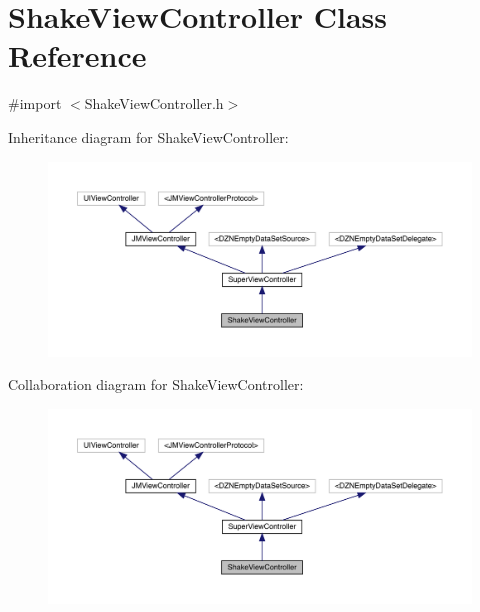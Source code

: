 \hypertarget{interface_shake_view_controller}{}\section{Shake\+View\+Controller Class Reference}
\label{interface_shake_view_controller}


{\ttfamily \#import $<$Shake\+View\+Controller.\+h$>$}



Inheritance diagram for Shake\+View\+Controller\+:\nopagebreak
\begin{figure}[H]
\begin{center}
\leavevmode
\includegraphics[width=350pt]{interface_shake_view_controller__inherit__graph}
\end{center}
\end{figure}


Collaboration diagram for Shake\+View\+Controller\+:\nopagebreak
\begin{figure}[H]
\begin{center}
\leavevmode
\includegraphics[width=350pt]{interface_shake_view_controller__coll__graph}
\end{center}
\end{figure}
